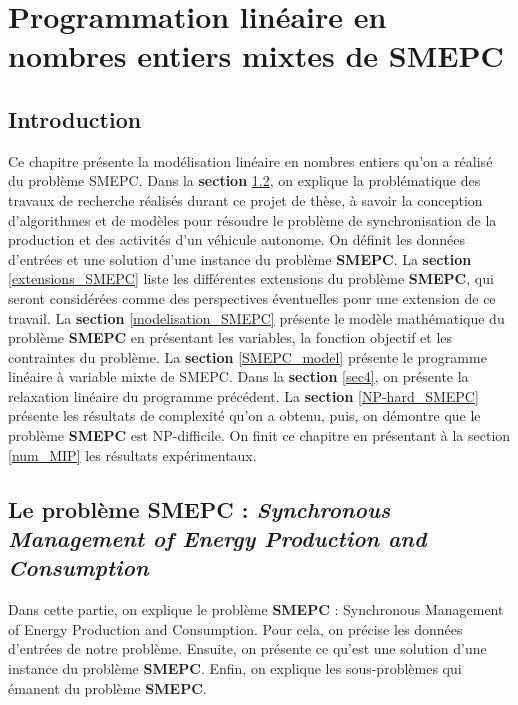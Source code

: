 \chapter{Programmation linéaire en nombres entiers mixtes de SMEPC}
\minitoc
\newpage
\label{MIP_3_plus}
\section{Introduction}
Ce chapitre présente la modélisation linéaire en nombres entiers qu'on a réalisé du problème SMEPC.
Dans la \textbf{section} \ref{Le modèle SMEPC}, on explique la problématique des travaux de recherche réalisés durant ce projet de thèse, à savoir la conception d'algorithmes et de modèles pour résoudre le problème de synchronisation de la production et des activités d'un véhicule autonome. On définit les données d'entrées et une solution d'une instance du problème \textbf{SMEPC}. La \textbf{section} \ref{extensions_SMEPC} liste les différentes extensions du problème \textbf{SMEPC}, qui seront considérées comme des perspectives éventuelles pour une extension de ce travail. La \textbf{section} \ref{modelisation_SMEPC} présente le modèle mathématique du problème \textbf{SMEPC} en présentant les variables, la fonction objectif et les contraintes du problème. La \textbf{section} \ref{SMEPC_model} présente le programme linéaire à variable mixte de SMEPC.  Dans la \textbf{section} \ref{sec4}, on présente la relaxation linéaire du programme précédent. %
 La \textbf{section} \ref{NP-hard_SMEPC} présente les résultats de complexité qu'on a obtenu,
 puis, on démontre que le problème \textbf{SMEPC} est NP-difficile. On finit ce chapitre en présentant à la section \ref{num_MIP} les résultats expérimentaux.


\section{Le problème SMEPC : \textit{Synchronous Management of Energy Production and Consumption}}
\label{Le modèle SMEPC}
Dans cette partie, on explique le problème \textbf{SMEPC} : Synchronous Management of Energy Production and Consumption. Pour cela, on précise les données d'entrées de notre problème. Ensuite, on présente ce qu'est une solution d'une instance du problème \textbf{SMEPC}. Enfin, on explique les sous-problèmes qui émanent du problème \textbf{SMEPC}. 

